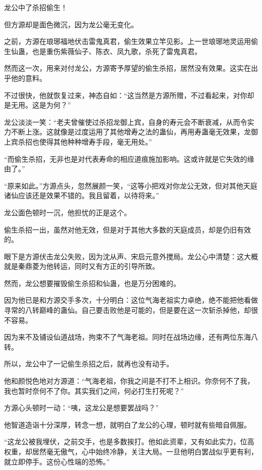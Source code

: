 
\begin{this_body}

龙公中了杀招偷生！

但方源却是面色微沉，因为龙公毫无变化。

之前，方源在琅琊福地伏击雷鬼真君，偷生效果立竿见影。上一世琅琊地灵运用偷生仙蛊，也是重伤紫薇仙子、陈衣、凤九歌，杀死了雷鬼真君。

然而这一次，用来对付龙公，方源寄予厚望的偷生杀招，居然没有效果。这实在出乎他的意料。

不过很快，他就恢复过来，神态自如：“这当然是方源所赠，不过看起来，对你却是无用。这是为何？”

龙公淡淡一笑：“老夫曾催使过杀招龙御上宾，自身的寿元会不断衰减，从而令实力不断上涨。这就像是过度运用了其他增寿之法的蛊仙，再用寿蛊毫无效果，龙御上宾杀招也使得其他种种增寿手段，毫无用处。”

“而偷生杀招，无非也是对代表寿命的相应道痕施加影响。这或许就是它失效的缘由了。”

“原来如此。”方源点头，忽然展颜一笑，“这等小把戏对你龙公无效，但对其他天庭诸仙应该还是效果不错的。我且留着，以待将来。”

龙公面色顿时一沉，他担忧的正是这个。

偷生杀招一出，虽然对他无效，但是对于其他大多数的天庭成员，却是仍旧有效的。

眼下是方源伏击龙公失败，因为沈从声、宋启元意外搅局。龙公心中清楚：这大概就是秦鼎菱为他转运，同时又有方正的引导所致。

然而，龙公想要摧毁偷生杀招和仙蛊，也是万分困难的。

因为他已是和方源交手多次，十分明白：这位气海老祖实力卓绝，绝不能把他看做寻常的八转巅峰的蛊仙。自己要击败他是可能的，但是要在这一次斩杀掉他，却很不容易。

因为来不及铺设仙道战场，拘束不了气海老祖。同时在战场边缘，还有两位东海八转。

所以，龙公中了一记偷生杀招之后，就再也没有动手。

他和颜悦色地对方源道：“气海老祖，你我之间是不打不上相识。你奈何不了我，我也暂时奈何不了你。其实我们之间，何必打生打死呢？”

方源心头顿时一动：“咦，这龙公是想要罢战吗？”

他智道造诣十分深厚，转念一想，就明白了龙公的心理，顿时就有些暗自佩服。

“这龙公被我埋伏，之前交手，也是多数挨打。他如此资辈，又有如此实力，位高权重，却居然毫无傲气，心中始终冷静，关注大局。一旦他明白罢战似乎更有利，就立即停手。这份心性端的恐怖。”


\end{this_body}
